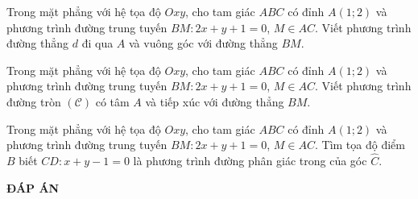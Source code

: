 \begin{bt}%
	Trong mặt phẳng với hệ tọa độ $Oxy$, cho tam giác $ABC$ có đỉnh $A(1;2)$ và phương trình đường trung tuyến $BM: 2x+y+1=0$, $M\in AC$. Viết phương trình đường thẳng $d$ đi qua $A$ và vuông góc với đường thẳng $BM$.
\end{bt}

\begin{bt}%
	Trong mặt phẳng với hệ tọa độ $Oxy$, cho tam giác $ABC$ có đỉnh $A(1;2)$ và phương trình đường trung tuyến $BM: 2x+y+1=0$, $M\in AC$. Viết phương trình đường tròn $(\mathscr{C})$ có tâm $A$ và tiếp xúc với đường thẳng $BM$.
\end{bt}			

\begin{bt}%
	Trong mặt phẳng với hệ tọa độ $Oxy$, cho tam giác $ABC$ có đỉnh $A(1;2)$ và phương trình đường trung tuyến $BM: 2x+y+1=0$, $M\in AC$. Tìm tọa độ điểm $B$ biết $CD: x+y-1=0$ là phương trình đường phân giác trong của góc $\widehat{C}$.
\end{bt}

\newpage
\begin{center}
	\textbf{ĐÁP ÁN}
\end{center}
\begin{multicols}{10}
	
\end{multicols}

